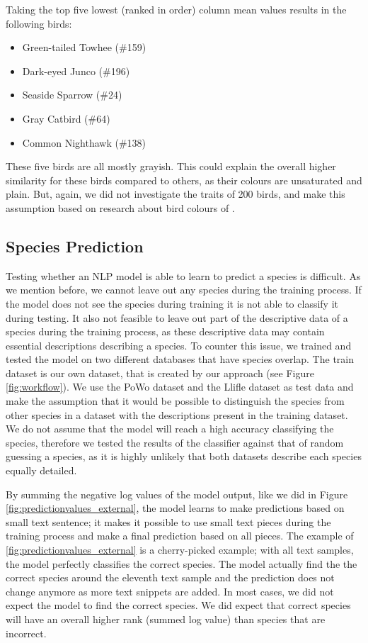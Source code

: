 \documentclass[a4paper, 12pt, oneside]{book} %
\begin{document}
Taking the top five lowest (ranked in order) column mean values results in the following birds: 
\begin{itemize}
    \setlength\itemsep{-0.25em}
    \item Green-tailed Towhee (\#159)
    \item Dark-eyed Junco (\#196)
    \item Seaside Sparrow (\#24)
    \item Gray Catbird (\#64)
    \item Common Nighthawk (\#138)
\end{itemize}
These five birds are all mostly grayish.
This could explain the overall higher similarity for these birds compared to others, as their colours are unsaturated and plain.
But, again, we did not investigate the traits of 200 birds, and make this assumption based on research about bird colours of \textcite{delhey_colour_2016}.

\subsection{Species Prediction}
Testing whether an NLP model is able to learn to predict a species is difficult.
As we mention before, we cannot leave out any species during the training process.
If the model does not see the species during training it is not able to classify it during testing.
It also not feasible to leave out part of the descriptive data of a species during the training process, as these descriptive data may contain essential descriptions describing a species.
To counter this issue, we trained and tested the model on two different databases that have species overlap.
The train dataset is our own dataset, that is created by our approach (see Figure \ref{fig:workflow}).
We use the PoWo dataset and the Llifle dataset as test data and make the assumption that it would be possible to distinguish the species from other species in a dataset with the descriptions present in the training dataset.
We do not assume that the model will reach a high accuracy classifying the species, therefore we tested the results of the classifier against that of random guessing a species, as it is highly unlikely that both datasets describe each species equally detailed.

By summing the negative log values of the model output, like we did in Figure \ref{fig:predictionvalues_external}, the model learns to make predictions based on small text sentence; it makes it possible to use small text pieces during the training process and make a final prediction based on all pieces.
The example of \ref{fig:predictionvalues_external} is a cherry-picked example; with all text samples, the model perfectly classifies the correct species.
The model actually find the the correct species around the eleventh text sample and the prediction does not change anymore as more text snippets are added.
In most cases, we did not expect the model to find the correct species. 
We did expect that correct species will have an overall higher rank (summed log value) than species that are incorrect.
\end{document}
